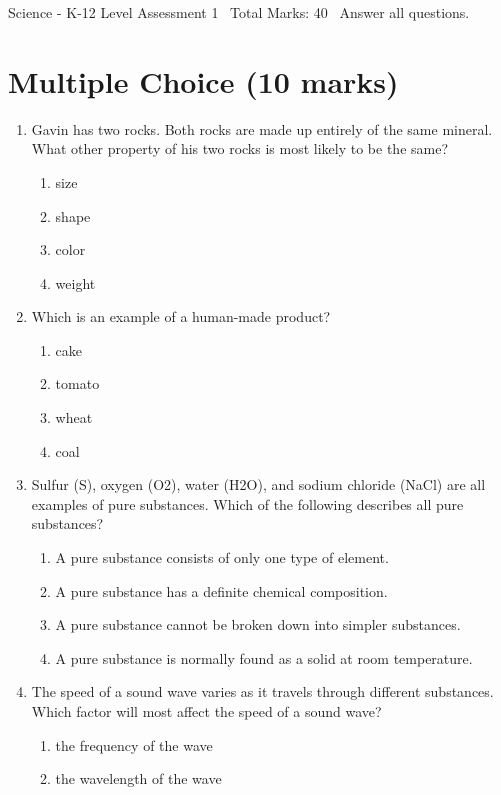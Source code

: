 \documentclass[12pt]{article}
\begin{document}
\begin{center}
Science - K-12 Level Assessment 1 \
Total Marks: 40 \
Answer all questions.
\end{center}

\section*{Multiple Choice (10 marks)}
\begin{enumerate}[label=\arabic*.]
\item Gavin has two rocks. Both rocks are made up entirely of the same mineral. What other
property of his two rocks is most likely to be the same?
\begin{enumerate}[label=(\alph*)]
    \item size
    \item shape
    \item color
    \item weight
\end{enumerate}
\item Which is an example of a human-made product?
\begin{enumerate}[label=(\alph*)]
    \item cake
    \item tomato
    \item wheat
    \item coal
\end{enumerate}
\item Sulfur (S), oxygen (O2), water (H2O), and sodium chloride (NaCl) are all examples of pure
substances. Which of the following describes all pure substances?
\begin{enumerate}[label=(\alph*)]
    \item A pure substance consists of only one type of element.
    \item A pure substance has a definite chemical composition.
    \item A pure substance cannot be broken down into simpler substances.
    \item A pure substance is normally found as a solid at room temperature.
\end{enumerate}
\item The speed of a sound wave varies as it travels through different substances. Which factor
will most affect the speed of a sound wave?
\begin{enumerate}[label=(\alph*)]
    \item the frequency of the wave
    \item the wavelength of the wave

\end{enumerate}
\end{enumerate}
\end{document}
